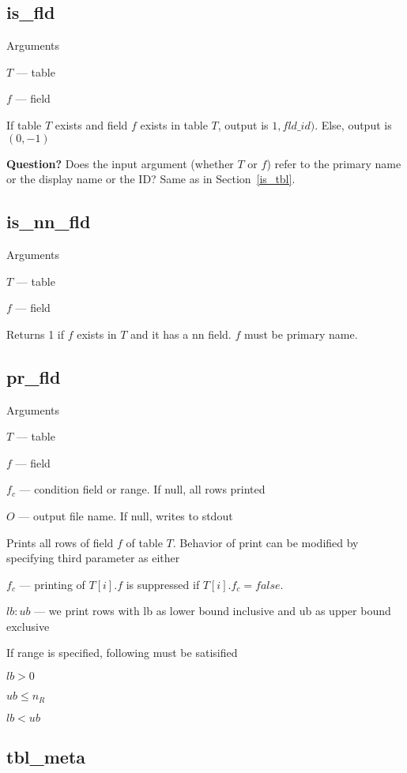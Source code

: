 \subsection{is\_fld}
\label{is_fld}
Arguments 
\be
\item \(T\) --- table
\item \(f\) --- field
\ee

If table \(T\) exists and field \(f\) exists in table \(T\), 
output is \(1, fld\_id)\). Else, output is \((0, -1)\)

{\bf Question?} Does the input argument (whether \(T\) or \(f\)) 
refer to the primary name or the display name or the ID? 
Same as in Section~\ref{is_tbl}.

\subsection{is\_nn\_fld}
\label{is_nn_fld}
Arguments 
\be
\item \(T\) --- table
\item \(f\) --- field
\ee

Returns 1 if \(f\) exists in \(T\) and it has a nn field. \(f\) must be
primary name.

\subsection{pr\_fld}
\label{pr_fld}
Arguments 
\be
\item \(T\) --- table
\item \(f\) --- field
\item \(f_c\) --- condition field or range. If null, all rows printed
\item \(O\) --- output file name. If null, writes to stdout
\ee

Prints all rows of field \(f\) of table \(T\). Behavior of print can be
modified by specifying third parameter as either
\be
\item \(f_c\) --- printing of \(T[i].f\) is suppressed if \(T[i].f_c = false\).
\item \(lb:ub\) --- we print rows with lb as lower bound inclusive and
ub as upper bound exclusive
\ee

If range is specified, following must be satisified
\be
\item \(lb > 0 \)
\item \(ub \leq n_R\)
\item \(lb < ub\)
\ee

\subsection{tbl\_meta}
\label{tbl_meta}

